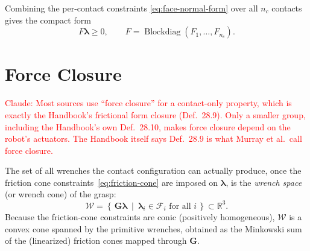 Combining the per-contact constraints \eqref{eq:face-normal-form} over all
$n_c$ contacts gives the compact form
\begin{equation}
    F \boldsymbol{\lambda} \ge 0 , \qquad F = \operatorname{Blockdiag}(F_1, \dots, F_{n_c}) .
    \label{eq:face-normal-full}
\end{equation}

\section{Force Closure}
\label{sec:force-closure}

\textcolor{red}{Claude: Most sources use ``force closure'' for a contact-only
property, which is exactly the Handbook's frictional form closure
(Def.~28.9). Only a smaller group, including the Handbook's own Def.~28.10,
makes force closure depend on the robot's actuators. The Handbook itself says
Def.~28.9 is what Murray et al.\ call force closure.}

The set of all wrenches the contact configuration can actually produce, once
the friction cone constraints~\eqref{eq:friction-cone} are imposed on
$\boldsymbol{\lambda}$, is the \emph{wrench space} (or wrench cone) of the
grasp:
\begin{equation}
    \mathcal{W} = \left\{\, \boldsymbol{G}\boldsymbol{\lambda} \ \middle|\ \boldsymbol{\lambda}_i \in \mathcal{F}_i \text{ for all } i \,\right\} \subset \mathbb{R}^3.
    \label{eq:wrench-space}
\end{equation}
Because the friction-cone constraints are conic (positively homogeneous),
$\mathcal{W}$ is a convex cone spanned by the primitive wrenches, obtained as
the Minkowski sum of the (linearized) friction cones mapped through
$\boldsymbol{G}$.

